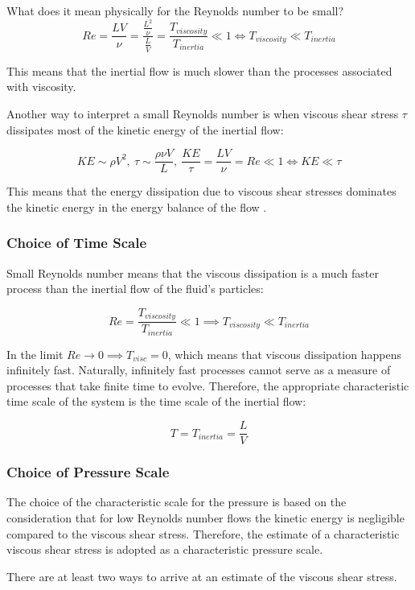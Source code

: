 What does it mean physically for the Reynolds number to be small? 
$$ Re = \frac{LV}{\nu}  = \frac{\frac{L^2}{\nu}}{\frac{L}{V}} = \frac{T_{viscosity}}{T_{inertia}} \ll 1 \Longleftrightarrow T_{viscosity} \ll T_{inertia} $$

This means that the inertial flow is much slower than the processes associated with viscosity.

Another way to interpret a small Reynolds number is when viscous shear stress $\tau$ dissipates most of the kinetic energy of the inertial flow:

$$ KE \sim \rho V^2,~ \tau \sim \frac{\rho \nu V}{L},~ \frac{KE}{\tau} = \frac{LV}{\nu} = Re \ll 1 \Longleftrightarrow KE \ll \tau$$

This means that the energy dissipation due to viscous shear stresses dominates the kinetic energy in the energy balance of the flow \cite[p. 484]{sivukhin}.

\subsubsection{Choice of Time Scale}

Small Reynolds number means that the viscous dissipation is a much faster process than the inertial flow of the fluid's particles:

$$ Re = \frac{T_{viscosity}}{T_{inertia}} \ll 1 \implies T_{viscosity} \ll T_{inertia} $$

In the limit $ Re \longrightarrow 0 \implies T_{visc} = 0$, which means that viscous dissipation happens infinitely fast. Naturally, infinitely fast processes cannot serve as a measure of processes that take finite time to evolve. Therefore, the appropriate characteristic time scale of the system is the time scale of the inertial flow:

$$ T = T_{inertia} = \frac{L}{V} $$

\subsubsection{Choice of Pressure Scale}

The choice of the characteristic scale for the pressure is based on the consideration that for low Reynolds number flows the kinetic energy is negligible compared to the viscous shear stress. Therefore, the estimate of a characteristic viscous shear stress is adopted as a characteristic pressure scale.


There are at least two ways to arrive at an estimate of the viscous shear stress.

